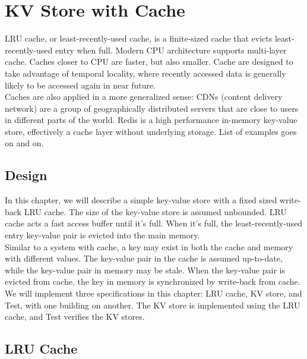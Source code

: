 % 

\usetikzlibrary{arrows.meta} %

\chapter{KV Store with Cache}

LRU cache, or least-recently-used cache, is a finite-sized cache that evicts 
least-recently-used entry when full. Modern CPU architecture supports
multi-layer cache. Caches closer to CPU are faster, but also smaller. Cache are
designed to take advantage of temporal locality, where recently accessed data is
generally likely to be accessed again in near future.\\

Caches are also applied in a more generalized sense: CDNs (content delivery
network) are a group of geographically distributed servers that are close to
users in different parts of the world. Redis is a high performance in-memory
key-value store, effectively a cache layer without underlying storage. List of
examples goes on and on.

\section{Design}

In this chapter, we will describe a simple key-value store with a fixed sized
write-back LRU cache. The size of the key-value store is assumed unbounded. LRU
cache acts a fast access buffer until it's full. When it's full, the
least-recently-used entry key-value pair is evicted into the main memory.\\

Similar to a system with cache, a key may exist in both the cache and memory
with different values. The key-value pair in the cache is assumed up-to-date,
while the key-value pair in memory may be stale. When the key-value pair is
evicted from cache, the key in memory is synchronized by write-back from
cache.\\

We will implement three specifications in this chapter: LRU cache, KV store, and
Test, with one building on another. The KV store is implemented using the LRU
cache, and Test verifies the KV stores.

\section{LRU Cache}


